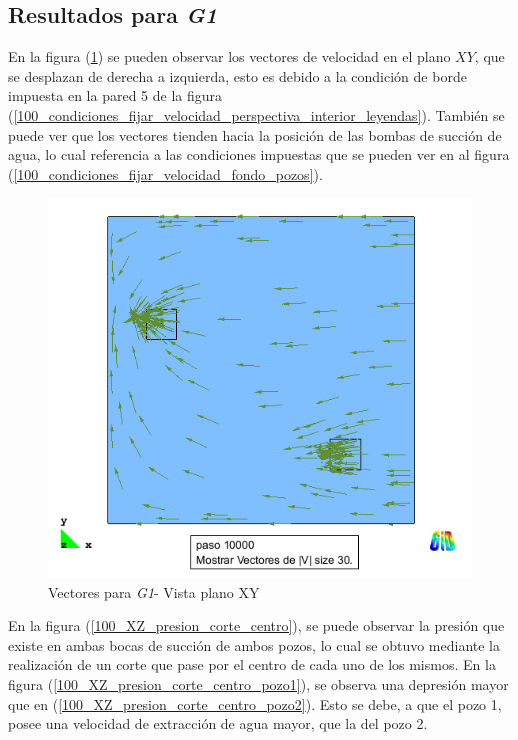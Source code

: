 \documentclass[10pt,a4paper,final]{article}
\begin{document}
\subsection{Resultados para \emph{G1}}
\label{resulg1}
En la figura (\ref{100_xy_vectores}) se pueden observar los vectores de velocidad en el plano $XY$, que se desplazan de derecha a izquierda, esto es debido a la condición de borde impuesta en la pared 5 de la figura (\ref{100_condiciones_fijar_velocidad_perspectiva_interior_leyendas}). También se puede ver que los vectores tienden hacia la posición de las bombas de succión de agua, lo cual referencia a las condiciones impuestas que se pueden ver en al figura (\ref{100_condiciones_fijar_velocidad_fondo_pozos}).
%
\begin{figure}[htbp]
\centerline{\includegraphics[scale=0.5]{img/100m/resul/100_xy_vectores}}
\caption{Vectores para \emph{G1}- Vista plano XY}
\label{100_xy_vectores}
\end{figure}
%
En la figura (\ref{100_XZ_presion_corte_centro}), se puede observar la presión que existe en ambas bocas de succión de ambos pozos, lo cual se obtuvo mediante la realización de un corte que pase por el centro de cada uno de los mismos. En la figura (\ref{100_XZ_presion_corte_centro_pozo1}), se observa una depresión mayor que en (\ref{100_XZ_presion_corte_centro_pozo2}). Esto se debe, a que el pozo 1, posee una velocidad de extracción de agua mayor, que la del pozo 2.
%
\end{document}

